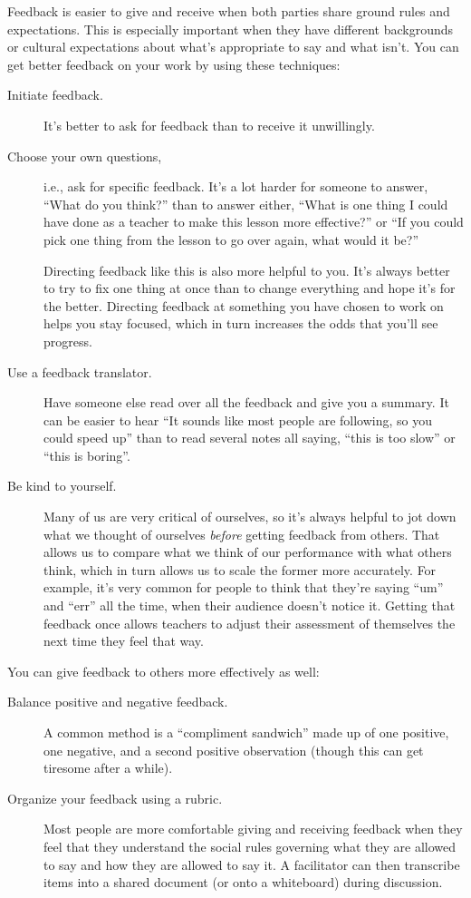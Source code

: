 Feedback is easier to give and receive when both parties share ground
rules and expectations. This is especially important when they have
different backgrounds or cultural expectations about what's appropriate
to say and what isn't. You can get better feedback on your work by using
these techniques:

\begin{description}
\item[Initiate feedback.]
It's better to ask for feedback than to receive it unwillingly.
\item[Choose your own questions,]
i.e., ask for specific feedback. It's a lot harder for someone to
answer, ``What do you think?'' than to answer either, ``What is one
thing I could have done as a teacher to make this lesson more
effective?'' or ``If you could pick one thing from the lesson to go
over again, what would it be?''

Directing feedback like this is also more helpful to you. It's
always better to try to fix one thing at once than to change
everything and hope it's for the better. Directing feedback at
something you have chosen to work on helps you stay focused, which
in turn increases the odds that you'll see progress.
\item[Use a feedback translator.]
Have someone else read over all the feedback and give you a summary.
It can be easier to hear ``It sounds like most people are following,
so you could speed up'' than to read several notes all saying, ``this
is too slow'' or ``this is boring''.
\item[Be kind to yourself.]
Many of us are very critical of ourselves, so it's always helpful to
jot down what we thought of ourselves \emph{before} getting feedback from
others. That allows us to compare what we think of our performance
with what others think, which in turn allows us to scale the former
more accurately. For example, it's very common for people to think
that they're saying ``um'' and ``err'' all the time, when their audience
doesn't notice it. Getting that feedback once allows teachers to
adjust their assessment of themselves the next time they feel that
way.
\end{description}

You can give feedback to others more effectively as well:

\begin{description}
\item[Balance positive and negative feedback.]
A common method is a ``compliment sandwich'' made up of one positive,
one negative, and a second positive observation (though this can get
tiresome after a while).
\item[Organize your feedback using a rubric.]
Most people are more comfortable giving and receiving feedback when
they feel that they understand the social rules governing what they
are allowed to say and how they are allowed to say it. A facilitator
can then transcribe items into a shared document (or onto a
whiteboard) during discussion.
\end{description}

